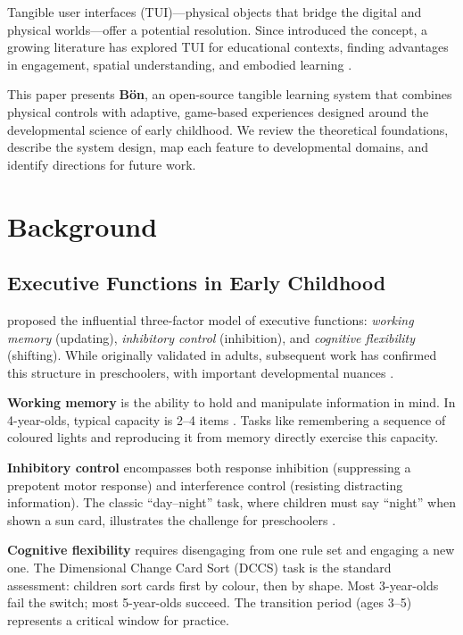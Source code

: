 \documentclass[12pt, a4paper]{article}
\newcommand{\Bodn}{B\"o\dh{}n}
\begin{document}
Tangible user interfaces (TUI)---physical objects that bridge the digital and
physical worlds---offer a potential resolution. Since \citet{ishii1997tangible}
introduced the concept, a growing literature has explored TUI for educational
contexts, finding advantages in engagement, spatial understanding, and
embodied learning \citep{marshall2007tangible, price2003tangibles}.

This paper presents \textbf{\Bodn{}}, an open-source tangible learning system that
combines physical controls with adaptive, game-based experiences designed around
the developmental science of early childhood. We review the theoretical
foundations, describe the system design, map each feature to developmental
domains, and identify directions for future work.

\section{Background}
\label{sec:background}

\subsection{Executive Functions in Early Childhood}
\label{sec:ef}

\citet{miyake2000unity} proposed the influential three-factor model of executive
functions: \emph{working memory} (updating), \emph{inhibitory control}
(inhibition), and \emph{cognitive flexibility} (shifting). While originally
validated in adults, subsequent work has confirmed this structure in preschoolers,
with important developmental nuances \citep{montroy2016development}.

\textbf{Working memory} is the ability to hold and manipulate information in
mind. In 4-year-olds, typical capacity is 2--4 items \citep{diamond2013executive}.
Tasks like remembering a sequence of coloured lights and reproducing it from
memory directly exercise this capacity.

\textbf{Inhibitory control} encompasses both response inhibition (suppressing a
prepotent motor response) and interference control (resisting distracting
information). The classic ``day--night'' task, where children must say ``night''
when shown a sun card, illustrates the challenge for preschoolers
\citep{diamond2013executive}.

\textbf{Cognitive flexibility} requires disengaging from one rule set and
engaging a new one. The Dimensional Change Card Sort (DCCS) task
\citep{zelazo2006dccs} is the standard assessment: children sort cards first by
colour, then by shape. Most 3-year-olds fail the switch; most 5-year-olds
succeed. The transition period (ages 3--5) represents a critical window for
practice.
\end{document}
